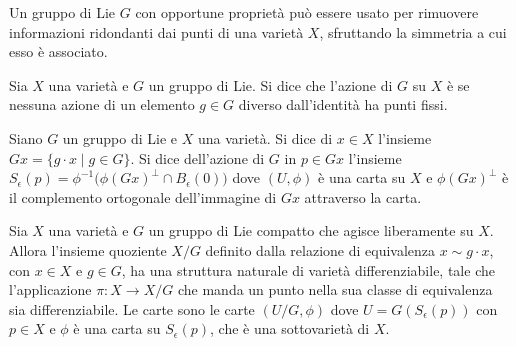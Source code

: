 Un gruppo di Lie $G$ con opportune proprietà può essere usato per rimuovere informazioni ridondanti dai punti di una varietà $X$, sfruttando la simmetria a cui esso è associato.
\begin{definition}
  Sia $X$ una varietà e $G$ un gruppo di Lie. Si dice che l'azione di $G$ su $X$ è  se nessuna azione di un elemento $g \in G$ diverso dall'identità ha punti fissi.
\end{definition}
\begin{definition}
  Siano $G$ un gruppo di Lie e $X$ una varietà. Si dice  di $x \in X$ l'insieme $Gx = \{g\cdot x\mid g \in G\}$. Si dice  dell'azione di $G$ in $p \in Gx$ l'insieme $S_{\epsilon}(p) = \phi^{-1}\big(\phi(Gx)^{\perp} \cap B_{\epsilon}(0)\big)$ dove $(U,\phi)$ è una carta su $X$ e $\phi(Gx)^{\perp}$ è il complemento ortogonale dell'immagine di $Gx$ attraverso la carta.
\end{definition}
\begin{theorem}
  Sia $X$ una varietà e $G$ un gruppo di Lie compatto che agisce liberamente su $X$. Allora l'insieme quoziente $X/G$ definito dalla relazione di equivalenza $x \sim g \cdot x$, con $x \in X$ e $g \in G$, ha una struttura naturale di varietà differenziabile, tale che l'applicazione $\pi:X \to X /G$ che manda un punto nella sua classe di equivalenza sia differenziabile. Le carte sono le carte $(U/G,\phi)$ dove $U = G(S_{\epsilon}(p))$ con $p \in X$ e $\phi$ è una carta su $S_{\epsilon}(p)$, che è una sottovarietà di $X$.
\end{theorem}
